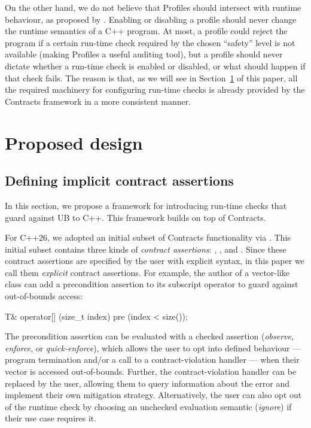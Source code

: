 On the other hand, we do not believe that Profiles should intersect with runtime behaviour, as proposed by  \cite{P3081R1}. Enabling or disabling a profile should never change the runtime semantics of a C++ program. %
At most, a profile could reject the program if a certain run-time check required by the chosen ``safety'' level is not available (making Profiles a useful auditing tool), but a profile should never dictate whether a run-time check is enabled or disabled, or what should happen if that check fails. The reason is that, as we will see in Section~\ref{design} of this paper, all the required machinery for configuring run-time checks is already provided by the Contracts framework in a more consistent manner.

\section{Proposed design}
\label{design}

\subsection{Defining implicit contract assertions}
\label{defineicas}

In this section, we propose a framework for introducing run-time checks that guard against UB to C++. This framework builds on top of Contracts.

For C++26, we adopted an initial subset of Contracts functionality via \cite{P2900R14}. This initial subset contains three kinds of \emph{contract assertions}: , , and . Since these contract assertions are specified by the user with explicit syntax, in this paper we call them \emph{explicit} contract assertions. For example, the author of a vector-like class can add a precondition assertion to its subscript operator to guard against out-of-bounds access:

\begin{codeblock}
T& operator[] (size_t index)
  pre (index < size());
\end{codeblock}

The precondition assertion  can be evaluated with a checked assertion  (\emph{observe}, \emph{enforce}, or \emph{quick-enforce}), which allows the user to opt into defined behaviour --- program termination and/or a call to a contract-violation handler --- when their vector is accessed out-of-bounds. Further, the contract-violation handler can be replaced by the user, allowing them to query information about the error and implement their own mitigation strategy. Alternatively, the user can also opt out of the runtime check by choosing an unchecked evaluation semantic (\emph{ignore}) if their use case requires it. 

